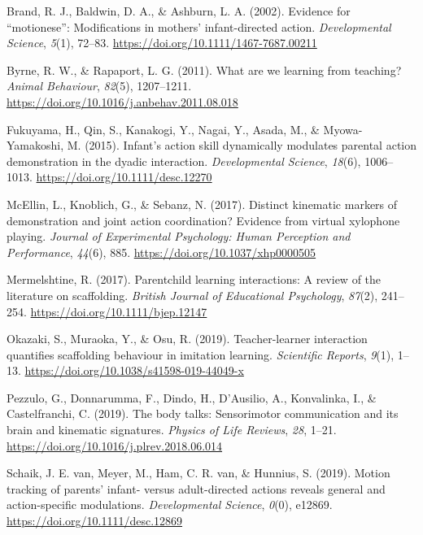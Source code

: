 \documentclass[
  man,floatsintext]{apa6}
\newlength{\cslhangindent}
\newlength{\cslentryspacingunit} %
\newenvironment{CSLReferences}[2] %
 {%
  \setlength{\parindent}{0pt}
  \ifodd #1
  \let\oldpar\par
  \def\par{\hangindent=\cslhangindent\oldpar}
  \fi
  \setlength{\parskip}{#2\cslentryspacingunit}
 }%
 {}
\begin{document}
\hypertarget{refs}{}
\begin{CSLReferences}{1}{0}
\leavevmode{}%
Brand, R. J., Baldwin, D. A., \& Ashburn, L. A. (2002). Evidence for {``motionese''}: Modifications in mothers' infant-directed action. \emph{Developmental Science}, \emph{5}(1), 72--83. \url{https://doi.org/10.1111/1467-7687.00211}

\leavevmode{}%
Byrne, R. W., \& Rapaport, L. G. (2011). What are we learning from teaching? \emph{Animal Behaviour}, \emph{82}(5), 1207--1211. \url{https://doi.org/10.1016/j.anbehav.2011.08.018}

\leavevmode{}%
Fukuyama, H., Qin, S., Kanakogi, Y., Nagai, Y., Asada, M., \& Myowa-Yamakoshi, M. (2015). Infant's action skill dynamically modulates parental action demonstration in the dyadic interaction. \emph{Developmental Science}, \emph{18}(6), 1006--1013. \url{https://doi.org/10.1111/desc.12270}

\leavevmode{}%
McEllin, L., Knoblich, G., \& Sebanz, N. (2017). Distinct kinematic markers of demonstration and joint action coordination? {Evidence} from virtual xylophone playing. \emph{Journal of Experimental Psychology: Human Perception and Performance}, \emph{44}(6), 885. \url{https://doi.org/10.1037/xhp0000505}

\leavevmode{}%
Mermelshtine, R. (2017). Parent\textendash child learning interactions: {A} review of the literature on scaffolding. \emph{British Journal of Educational Psychology}, \emph{87}(2), 241--254. \url{https://doi.org/10.1111/bjep.12147}

\leavevmode{}%
Okazaki, S., Muraoka, Y., \& Osu, R. (2019). Teacher-learner interaction quantifies scaffolding behaviour in imitation learning. \emph{Scientific Reports}, \emph{9}(1), 1--13. \url{https://doi.org/10.1038/s41598-019-44049-x}

\leavevmode{}%
Pezzulo, G., Donnarumma, F., Dindo, H., D'Ausilio, A., Konvalinka, I., \& Castelfranchi, C. (2019). The body talks: {Sensorimotor} communication and its brain and kinematic signatures. \emph{Physics of Life Reviews}, \emph{28}, 1--21. \url{https://doi.org/10.1016/j.plrev.2018.06.014}

\leavevmode{}%
Schaik, J. E. van, Meyer, M., Ham, C. R. van, \& Hunnius, S. (2019). Motion tracking of parents' infant- versus adult-directed actions reveals general and action-specific modulations. \emph{Developmental Science}, \emph{0}(0), e12869. \url{https://doi.org/10.1111/desc.12869}


\end{CSLReferences}
\end{document}

